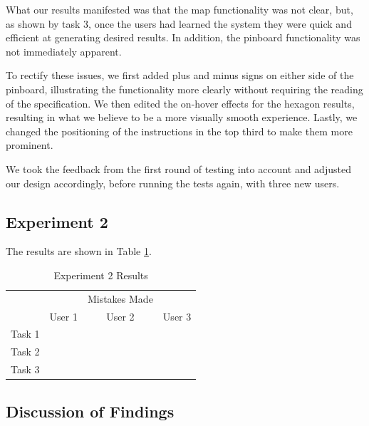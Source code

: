 \documentclass[10pt,a4paper]{article}
\begin{document}
What our results manifested was that the map functionality was not clear, but, as shown by task 3, once the users had learned the system they were quick and efficient at generating desired results. In addition, the pinboard functionality was not immediately apparent.

To rectify these issues, we first added plus and minus signs on either side of the pinboard, illustrating the functionality more clearly without requiring the reading of the specification. We then edited the on-hover effects for the hexagon results, resulting in what we believe to be a more visually smooth experience. Lastly, we changed the positioning of the instructions in the top third to make them more prominent.

We took the feedback from the first round of testing into account and adjusted our design accordingly, before running the tests again, with three new users.

\subsection*{Experiment 2}

The results are shown in Table \ref{table:experiment-2}.

\begin{table}[H]
\centering
\begin{tabular}{c|ccc|}
\cline{2-4}
                             &                             & Mistakes Made               &        \\ \cline{2-4} 
                             & \multicolumn{1}{c|}{User 1} & \multicolumn{1}{c|}{User 2} & User 3 \\ \hline
\multicolumn{1}{|c|}{Task 1} & \multicolumn{1}{c|}{}       & \multicolumn{1}{c|}{}       &        \\ \hline
\multicolumn{1}{|c|}{Task 2} & \multicolumn{1}{c|}{}       & \multicolumn{1}{c|}{}       &        \\ \hline
\multicolumn{1}{|c|}{Task 3} & \multicolumn{1}{c|}{}       & \multicolumn{1}{c|}{}       &        \\ \hline
\end{tabular}
\caption{Experiment 2 Results \label{table:experiment-2}}
\end{table}

\subsection*{Discussion of Findings}
\end{document}
